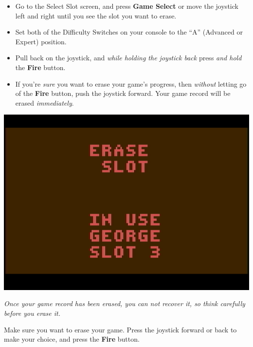 \documentclass[10pt,twocolumn,openany,article]{memoir}
\begin{document}
\begin{itemize}
\item Go  to the Select Slot  screen, and press \textbf{Game  Select} or
  move  the joystick  left and  right until  you see  the slot  you want
  to erase.
\item Set both  of the Difficulty Switches on your  console to the ``A''
  (Advanced or Expert) position.
\item Pull  back on the  joystick, and \emph{while holding  the joystick
    back} press \emph{and hold} the \textbf{Fire} button.
\item If you're \emph{sure} you want to erase your game's progress, then
  \emph{without}  letting  go  of  the \textbf{Fire}  button,  push  the
  joystick  forward. \ifdefined\DEMO  Your  game record  will be  erased
  \emph{immediately}. \fi
\end{itemize}

\begin{center}
  \includegraphics[width=\columnwidth]{../Manual/EraseSlotNTSC.png}
\end{center}

\ifdefined\DEMO

\emph{Once your game record has been  erased, you can not recover it, so
  think carefully before you erase it.}

\else

Make sure  you want to  erase your game.  Press the joystick  forward or
back to make your choice, and press the \textbf{Fire} button.
\end{document}
